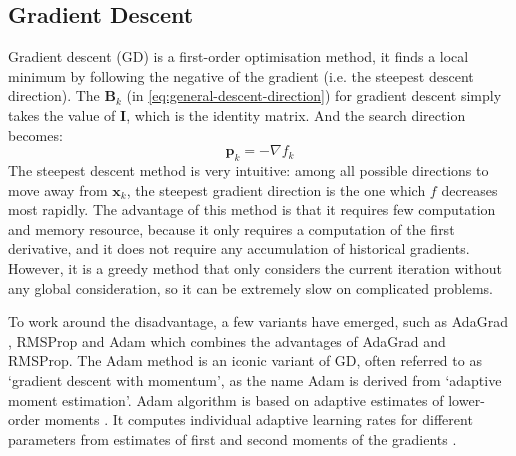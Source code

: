 \subsection{Gradient Descent}\label{sec:GD}
Gradient descent (GD) is a first-order optimisation method, it finds a local minimum by following the negative of the gradient (i.e. the steepest descent direction). The $\textbf{B}_k$ (in \cref{eq:general-descent-direction}) for gradient descent simply takes the value of $\textbf{I}$, which is the identity matrix. And the search direction becomes:
\begin{equation}
  \textbf{p}_k = -\nabla f_k
\end{equation}
The steepest descent method is very intuitive: among all possible directions to move away from $\textbf{x}_{k}$, the steepest gradient direction is the one which $f$ decreases most rapidly. The advantage of this method is that it requires few computation and memory resource, because it only requires a computation of the first derivative, and it does not require any accumulation of historical gradients. However, it is a greedy method that only considers the current iteration without any global consideration, so it can be extremely slow on complicated problems. \cite{Nocedal2006}

To work around the disadvantage, a few variants have emerged, such as AdaGrad \cite{Duchi2011}, RMSProp \cite{Tieleman2012} and Adam \cite{Kingma2015} which combines the advantages of AdaGrad and RMSProp. The Adam method is an iconic variant of GD, often referred to as `gradient descent with momentum', as the name Adam is derived from `adaptive moment estimation'. Adam algorithm is based on adaptive estimates of lower-order moments \cite{Kingma2015}. It computes individual adaptive learning rates for different parameters from estimates of first and second moments of the gradients \cite{Kingma2015}.


